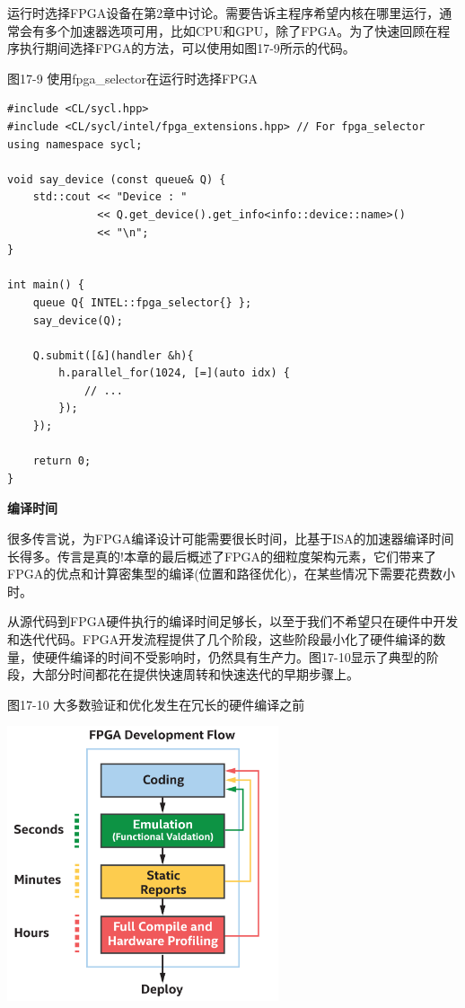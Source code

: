 运行时选择FPGA设备在第2章中讨论。需要告诉主程序希望内核在哪里运行，通常会有多个加速器选项可用，比如CPU和GPU，除了FPGA。为了快速回顾在程序执行期间选择FPGA的方法，可以使用如图17-9所示的代码。\par

\hspace*{\fill} \par %
图17-9 使用fpga\_selector在运行时选择FPGA
\begin{lstlisting}[caption={}]
#include <CL/sycl.hpp>
#include <CL/sycl/intel/fpga_extensions.hpp> // For fpga_selector
using namespace sycl;

void say_device (const queue& Q) {
	std::cout << "Device : "
			  << Q.get_device().get_info<info::device::name>() 
			  << "\n";
}

int main() {
	queue Q{ INTEL::fpga_selector{} };
	say_device(Q);
	
	Q.submit([&](handler &h){
		h.parallel_for(1024, [=](auto idx) {
			// ...
		});
	});

	return 0;
}
\end{lstlisting}

\hspace*{\fill} \par %
\textbf{编译时间}

很多传言说，为FPGA编译设计可能需要很长时间，比基于ISA的加速器编译时间长得多。传言是真的!本章的最后概述了FPGA的细粒度架构元素，它们带来了FPGA的优点和计算密集型的编译(位置和路径优化)，在某些情况下需要花费数小时。\par

从源代码到FPGA硬件执行的编译时间足够长，以至于我们不希望只在硬件中开发和迭代代码。FPGA开发流程提供了几个阶段，这些阶段最小化了硬件编译的数量，使硬件编译的时间不受影响时，仍然具有生产力。图17-10显示了典型的阶段，大部分时间都花在提供快速周转和快速迭代的早期步骤上。\par

\hspace*{\fill} \par %
图17-10 大多数验证和优化发生在冗长的硬件编译之前
\begin{center}
	\includegraphics[width=0.6\textwidth]{content/chapter-17/images/10}
\end{center}

